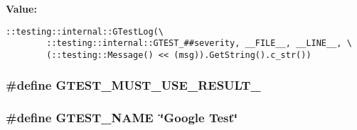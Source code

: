 \textbf{Value:}

\begin{Code}\begin{verbatim}::testing::internal::GTestLog(\
        ::testing::internal::GTEST_##severity, __FILE__, __LINE__, \
        (::testing::Message() << (msg)).GetString().c_str())
\end{verbatim}
\end{Code}
\subsubsection{\setlength{\rightskip}{0pt plus 5cm}\#define GTEST\_\-MUST\_\-USE\_\-RESULT\_\-}\label{gtest-port_8h_278b3d9816b7f2389f2cf362e8ba6a3c}


\subsubsection{\setlength{\rightskip}{0pt plus 5cm}\#define GTEST\_\-NAME~\char`\"{}Google Test\char`\"{}}\label{gtest-port_8h_158df8eb2f6338a36f13b8108fb36594}


